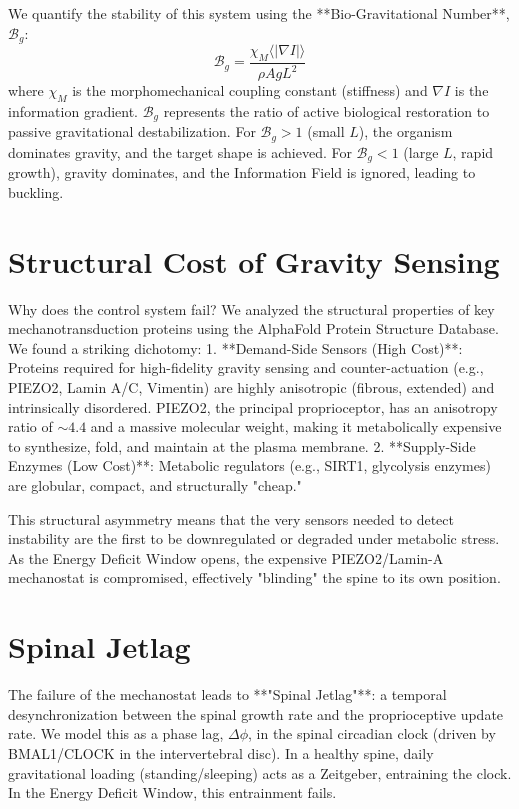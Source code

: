 \documentclass[12pt]{article}
\begin{document}
We quantify the stability of this system using the **Bio-Gravitational Number**, $\mathcal{B}_g$:
\begin{equation}
\mathcal{B}_g = \frac{\chi_M \langle |\nabla I| \rangle}{\rho A g L^2}
\end{equation}
where $\chi_M$ is the morphomechanical coupling constant (stiffness) and $\nabla I$ is the information gradient. $\mathcal{B}_g$ represents the ratio of active biological restoration to passive gravitational destabilization. For $\mathcal{B}_g > 1$ (small $L$), the organism dominates gravity, and the target shape is achieved. For $\mathcal{B}_g < 1$ (large $L$, rapid growth), gravity dominates, and the Information Field is ignored, leading to buckling.

\section*{Structural Cost of Gravity Sensing}

Why does the control system fail? We analyzed the structural properties of key mechanotransduction proteins using the AlphaFold Protein Structure Database. We found a striking dichotomy:
1.  **Demand-Side Sensors (High Cost)**: Proteins required for high-fidelity gravity sensing and counter-actuation (e.g., PIEZO2, Lamin A/C, Vimentin) are highly anisotropic (fibrous, extended) and intrinsically disordered. PIEZO2, the principal proprioceptor, has an anisotropy ratio of $\sim 4.4$ and a massive molecular weight, making it metabolically expensive to synthesize, fold, and maintain at the plasma membrane.
2.  **Supply-Side Enzymes (Low Cost)**: Metabolic regulators (e.g., SIRT1, glycolysis enzymes) are globular, compact, and structurally "cheap."

This structural asymmetry means that the very sensors needed to detect instability are the first to be downregulated or degraded under metabolic stress. As the Energy Deficit Window opens, the expensive PIEZO2/Lamin-A mechanostat is compromised, effectively "blinding" the spine to its own position.

\section*{Spinal Jetlag}

The failure of the mechanostat leads to **"Spinal Jetlag"**: a temporal desynchronization between the spinal growth rate and the proprioceptive update rate. We model this as a phase lag, $\Delta \phi$, in the spinal circadian clock (driven by BMAL1/CLOCK in the intervertebral disc). In a healthy spine, daily gravitational loading (standing/sleeping) acts as a Zeitgeber, entraining the clock. In the Energy Deficit Window, this entrainment fails.
\end{document}
